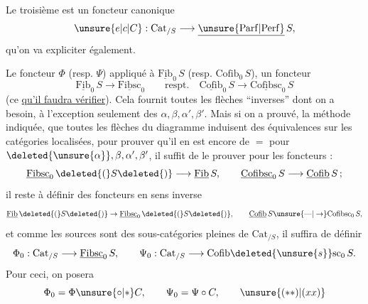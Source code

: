 Le troisième est un foncteur canonique
\[
\unsure{e|c|C}:\mathrm{Cat}_{/S}\longrightarrow\underline{\unsure{\mathrm{Parf}|\mathrm{Perf}}}\,S,
\]
qu'on va expliciter également.

Le foncteur $\Phi$ (resp. $\Psi$) appliqué à $\underline{\mathrm{Fib}}_0\,S$
(resp. $\mathrm{Cofib}_0\,S$),   un foncteur
\[
\underline{\mathrm{Fib}}_0\,S\longrightarrow\underline{\mathrm{Fibsc}}_0
\qquad\text{respt.}\quad
\underline{\mathrm{Cofib}}_0\,S\longrightarrow\underline{\mathrm{Cofibsc}}_0\,S
\tag*{$(*)$}
\]
(ce \uline{qu'il faudra vérifier}). Cela fournit toutes
les flèches ``inverses'' dont on a besoin, à l'exception seulement des $\alpha,\beta,\alpha',\beta'$. Mais si on a
prouvé,  la méthode indiquée, que toutes les
flèches du diagramme induisent des équivalences sur les catégories localisées, pour prouver
qu'il en est encore de $=$ pour $\deleted{\unsure{\alpha}},\beta,\alpha',\beta'$, il
suffit de le prouver pour les  foncteurs :
\[
\underline{\mathrm{Fibsc}}_0\,\deleted{(}S\deleted{)}\longrightarrow\underline{\mathrm{Fib}}\,S,\qquad
\underline{\mathrm{Cofibsc}}_0\,S\longrightarrow\underline{\mathrm{Cofib}}\,S\,;
\]
 il reste à définir des foncteurs en sens
inverse
\[
\underline{\mathrm{Fib}}\,\deleted{(}S\deleted{)}\to\underline{\mathrm{Fibsc}}_0\,\deleted{(}S\deleted{)},\qquad
\underline{\mathrm{Cofib}}\,S\unsure{\text{---}|\to}\mathrm{Cofibsc}_0\,S,
\]
et comme les sources sont des sous-catégories
pleines de $\mathrm{Cat}_{/S}$, il suffira de définir
\[
\Phi_0:\mathrm{Cat}_{/S}\longrightarrow\underline{\mathrm{Fibsc}}_0\,S,\qquad
\Psi_0:\mathrm{Cat}_{/S}\longrightarrow\mathrm{Cofib}\deleted{\unsure{s}}\mathrm{sc}_0\,S.
\]
Pour ceci, on posera
\[
\Phi_0=\Phi\unsure{\circ|*}C,\qquad\Psi_0=\Psi\circ C,\tag*{$\unsure{(**)|(xx)}$}
\]
